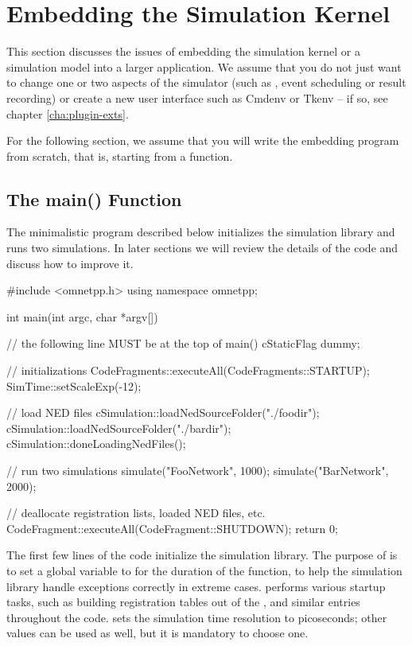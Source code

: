 \section{Embedding the {\opp} Simulation Kernel}
\label{sec:embedding:embedding}

This section discusses the issues of embedding the simulation kernel
or a simulation model into a larger application. We assume that you
do not just want to change one or two aspects of the simulator
(such as , event scheduling or result recording) or create a new user interface
such as Cmdenv or Tkenv -- if so, see chapter \ref{cha:plugin-exts}.

For the following section, we assume that you will write the embedding
program from scratch, that is, starting from a  function.

\subsection{The main() Function}
\label{sec:embedding:main-function}

The minimalistic program described below initializes the simulation library
and runs two simulations. In later sections we will review the details
of the code and discuss how to improve it.

\begin{cpp}
#include <omnetpp.h>
using namespace omnetpp;

int main(int argc, char *argv[])
{
    // the following line MUST be at the top of main()
    cStaticFlag dummy;

    // initializations
    CodeFragments::executeAll(CodeFragments::STARTUP);
    SimTime::setScaleExp(-12);

    // load NED files
    cSimulation::loadNedSourceFolder("./foodir");
    cSimulation::loadNedSourceFolder("./bardir");
    cSimulation::doneLoadingNedFiles();

    // run two simulations
    simulate("FooNetwork", 1000);
    simulate("BarNetwork", 2000);

    // deallocate registration lists, loaded NED files, etc.
    CodeFragment::executeAll(CodeFragment::SHUTDOWN);
    return 0;
}
\end{cpp}

The first few lines of the code initialize the simulation library. The
purpose of  is to set a global variable to 
for the duration of the  function, to help the simulation
library handle exceptions correctly in extreme cases.
 performs various startup
tasks, such as building registration tables out of the ,
 and similar entries throughout the code.
 sets the simulation time resolution to
picoseconds; other values can be used as well, but it is mandatory to
choose one.

